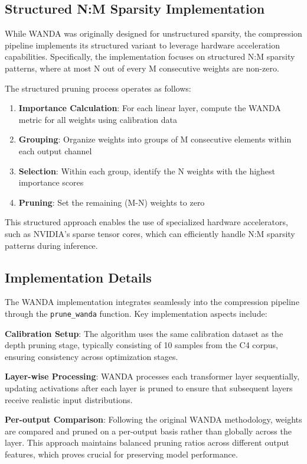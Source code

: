 \subsection{Structured N:M Sparsity Implementation}

While WANDA was originally designed for unstructured sparsity, the compression pipeline implements its structured variant to leverage hardware acceleration capabilities. Specifically, the implementation focuses on structured N:M sparsity patterns, where at most N out of every M consecutive weights are non-zero.

The structured pruning process operates as follows:

\begin{enumerate}
   \item \textbf{Importance Calculation}: For each linear layer, compute the WANDA metric for all weights using calibration data
   \item \textbf{Grouping}: Organize weights into groups of M consecutive elements within each output channel
   \item \textbf{Selection}: Within each group, identify the N weights with the highest importance scores
   \item \textbf{Pruning}: Set the remaining (M-N) weights to zero
\end{enumerate}

This structured approach enables the use of specialized hardware accelerators, such as NVIDIA's sparse tensor cores, which can efficiently handle N:M sparsity patterns during inference.

\subsection{Implementation Details}

The WANDA implementation integrates seamlessly into the compression pipeline through the \texttt{prune\_wanda} function. Key implementation aspects include:

\textbf{Calibration Setup}: The algorithm uses the same calibration dataset as the depth pruning stage, typically consisting of 10 samples from the C4 corpus, ensuring consistency across optimization stages.

\textbf{Layer-wise Processing}: WANDA processes each transformer layer sequentially, updating activations after each layer is pruned to ensure that subsequent layers receive realistic input distributions.

\textbf{Per-output Comparison}: Following the original WANDA methodology, weights are compared and pruned on a per-output basis rather than globally across the layer. This approach maintains balanced pruning ratios across different output features, which proves crucial for preserving model performance.

